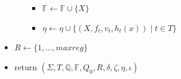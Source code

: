 \documentclass{article}
\newcommand{\Xset}{\!\leftarrow\!}
\newcommand{\Xin}{\!\in\!}
\newcommand{\YF}{\mathbb{F}}
\newcommand{\YQ}{\mathbb{Q}}
\theoremstyle{definition}
\begin{document}
\begin{multicols}{2}
\begin{itemize}[leftmargin=0in]
\begin{itemize}
            \begin{itemize}
                \item[] $\YF \Xset \YF \cup \{ X \}$
                \item[] $\eta \Xset \eta \cup \{(X, f_t, v_t, h_t(x)) \mid t \Xin T\}$
            \end{itemize}
        \end{itemize}
        \smallskip
        \item[] $R \Xset \{ 1, \dots, maxreg \}$
        \item[] return $(\Sigma, T, \YQ, \YF, Q_0, R, \delta, \zeta, \eta, \iota)$
        \\ \\
    \end{itemize}


\end{multicols}
\end{document}
